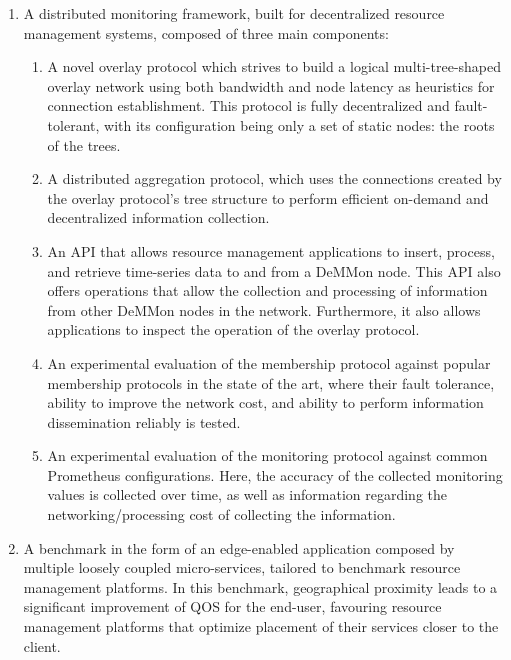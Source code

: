 \begin{enumerate}
    \item A distributed monitoring framework, built for decentralized resource management systems, composed of three main components: {
        \begin{enumerate}
            \item A novel overlay protocol which strives to build a logical multi-tree-shaped overlay network using both bandwidth and node latency as heuristics for connection establishment. This protocol is fully decentralized and fault-tolerant, with its configuration being only a set of static nodes: the roots of the trees.
            
            \item A distributed aggregation protocol, which uses the connections created by the overlay protocol's tree structure to perform efficient on-demand and decentralized information collection.
            
            \item An API that allows resource management applications to insert, process, and retrieve time-series data to and from a DeMMon node. This API also offers operations that allow the collection and processing of information from other DeMMon nodes in the network. Furthermore, it also allows applications to inspect the operation of the overlay protocol.
            
            \item An experimental evaluation of the membership protocol against popular membership protocols in the state of the art, where their fault tolerance, ability to improve the network cost, and ability to perform information dissemination reliably is tested. 

            \item An experimental evaluation of the monitoring protocol against common Prometheus \cite{prometheus} configurations. Here, the accuracy of the collected monitoring values is collected over time, as well as information regarding the networking/processing cost of collecting the information.
            
        \end{enumerate}
        }
    \item A benchmark in the form of an edge-enabled application composed by multiple loosely coupled micro-services, tailored to benchmark resource management platforms. In this benchmark, geographical proximity leads to a significant improvement of QOS for the end-user, favouring resource management platforms that optimize placement of their services closer to the client.
    
\end{enumerate}

